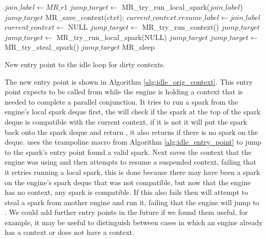 \begin{algorithm}[tbp]
\begin{algorithmic}
        \State $join\_label \gets MR\_r1$
        \State $jump\_target \gets$ MR\_try\_run\_local\_spark($join\_label$)
            \Goto $jump\_target$
        \EndIf
        \State MR\_save\_context($ctxt$);
        \State $current\_context.resume\_label \gets join\_label$
        \State $current\_context \gets$ NULL
        \State $jump\_target \gets$ MR\_try\_run\_context()
            \Goto $jump\_target$
        \EndIf
        \State $jump\_target \gets$ MR\_try\_run\_local\_spark(NULL)
            \Goto $jump\_target$
        \EndIf
        \State $jump\_target \gets$ MR\_try\_steal\_spark()
            \Goto $jump\_target$
        \EndIf
        \Goto MR\_sleep
    \EndProcedure
\end{algorithmic}
\caption{New entry point to the idle loop for dirty contexts.}
\label{alg:idle_orig_context}
\end{algorithm}

The new entry point \idleorigcontext is shown in Algorithm
\ref{alg:idle_orig_context}.
This entry point expects to be called from \joinandcontinue while the engine
is holding a context that is needed to complete a parallel conjunction.
It tries to run a spark from the engine's local spark deque first,
the \tryrunlocalspark will check if the spark at the top of the spark deque
is compatible with the current context,
if it is not it will put the spark back onto the spark deque and return
\NULL, it also returns \NULL if there is no spark on the deque.
\idleorigcontext uses the trampoline macro from Algorithm
\ref{alg:idle_entry_point} to jump to the spark's entry point
\tryrunlocalspark found a valid spark.
Next \idleorigcontext saves the context that the engine was using and then
attempts to resume a suspended context,
failing that it retries running a local spark,
this is done because there may have been a spark on the engine's spark deque
that was not compatible, but now that the engine has no context, any spark
is compatible.
If this also fails then
\idleorigcontext will attempt to steal a spark from another engine and run
it,
failing that the engine will jump to \sleep.
We could add further entry points in the future if we found them useful,
for example,
it may be useful to distinguish between cases in which an engine already has a
context or does not have a context.

